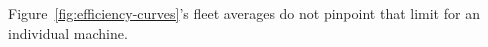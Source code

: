 Figure~\ref{fig:efficiency-curves}'s fleet averages do not pinpoint that limit for an individual machine. %
